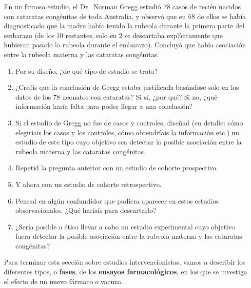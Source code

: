 \documentclass[
]{book}
\theoremstyle{definition}
\theoremstyle{definition}
\theoremstyle{definition}
\theoremstyle{definition}
\theoremstyle{remark}
\begin{document}
\begin{rmdexercici}
En un \href{https://www.ncbi.nlm.nih.gov/pmc/articles/PMC2272051/pdf/epidinfect00028-0013.pdf}{famoso estudio}, el \href{https://es.wikipedia.org/wiki/Norman_Gregg}{Dr.~Norman Gregg} estudió 78 casos de recién nacidos con cataratas congénitas de toda Australia, y observó que en 68 de ellos se había diagnosticado que la madre había tenido la rubeola durante la primera parte del embarazo (de los 10 restantes, solo en 2 se descartaba explícitamente que hubieran pasado la rubeola durante el embarazo). Concluyó que había asociación entre la rubeola materna y las cataratas congénitas.

\begin{enumerate}
\def\labelenumi{\alph{enumi}.}
\item
  Por su diseño, ¿de qué tipo de estudio se trata?
\item
  ¿Creéis que la conclusión de Gregg estaba justificada basándose solo en los datos de los 78 neonatos con cataratas? Si sí, ¿por qué? Si no, ¿qué información haría falta para poder llegar a una conclusión?
\item
  Si el estudio de Gregg no fue de casos y controles, diseñad (en detalle: cómo elegiríais los casos y los controles, cómo obtendríais la información etc.) un estudio de este tipo cuyo objetivo sea detectar la posible asociación entre la rubeola materna y las cataratas congénitas.
\item
  Repetid la pregunta anterior con un estudio de cohorte prospectivo.
\item
  Y ahora con un estudio de cohorte retrospectivo.
\item
  Pensad en algún confundidor que pudiera aparecer en estos estudios observacionales. ¿Qué haríais para descartarlo?
\item
  ¿Sería posible o ético llevar a cabo un estudio experimental cuyo objetivo fuera detectar la posible asociación entre la rubeola materna y las cataratas congénitas?
\end{enumerate}
\end{rmdexercici}

Para terminar esta sección sobre estudios intervencionistas, vamos a describir los diferentes tipos, o \textbf{fases}, de los \textbf{ensayos farmacológicos}, en los que se investiga el efecto de un nuevo fármaco o vacuna.
\end{document}
